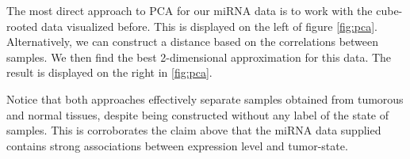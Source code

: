 \documentclass[12pt,english]{article}\usepackage{graphicx, color}
\makeatletter
\newcommand{\hlfunctioncall}[1]{\textcolor[rgb]{0.501960784313725,0,0.329411764705882}{\textbf{#1}}}%
\newcommand{\hlstring}[1]{\textcolor[rgb]{0.6,0.6,1}{#1}}%
\newcommand{\hlcomment}[1]{\textcolor[rgb]{0.180392156862745,0.6,0.341176470588235}{#1}}%
\newenvironment{kframe}{%
 \def\at@end@of@kframe{}%
 \ifinner\ifhmode%
  \def\at@end@of@kframe{\end{minipage}}%
  \begin{minipage}{\columnwidth}%
 \fi\fi%
 \def\FrameCommand##1{\hskip\@totalleftmargin \hskip-\fboxsep
 \colorbox{shadecolor}{##1}\hskip-\fboxsep
     \hskip-\linewidth \hskip-\@totalleftmargin \hskip\columnwidth}%
 \MakeFramed {\advance\hsize-\width
   \@totalleftmargin\z@ \linewidth\hsize
   \@setminipage}}%
 {\par\unskip\endMakeFramed%
 \at@end@of@kframe}
\newenvironment{knitrout}{}{} %
\numberwithin{equation}{section}
\numberwithin{figure}{section}
\theoremstyle{plain}
\theoremstyle{remark}
\makeatother
\begin{document}

The most direct approach
to PCA for our miRNA data is to work
with the cube-rooted data visualized before. This is displayed on the
left of figure \ref{fig:pca}. Alternatively, we can construct a
distance based on the correlations between samples. We then find the
best 2-dimensional approximation for this data. The result is
displayed on the right in \ref{fig:pca}.

Notice that both approaches effectively separate samples obtained
from tumorous and normal tissues, despite being constructed without
any label of the state of samples. This is corroborates the
claim above that the miRNA data supplied contains strong associations
between expression level and tumor-state.
\end{document}
